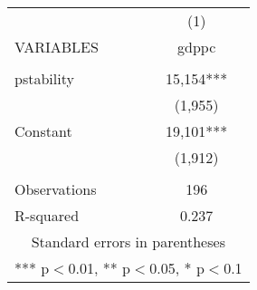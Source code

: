 \documentclass[]{article}
\begin{document}
\begin{tabular}{lc} \hline
 & (1) \\
VARIABLES & gdppc \\ \hline
 &  \\
pstability & 15,154*** \\
 & (1,955) \\
Constant & 19,101*** \\
 & (1,912) \\
 &  \\
Observations & 196 \\
 R-squared & 0.237 \\ \hline
\multicolumn{2}{c}{ Standard errors in parentheses} \\
\multicolumn{2}{c}{ *** p$<$0.01, ** p$<$0.05, * p$<$0.1} \\
\end{tabular}
\end{document}
